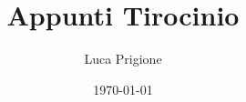 \documentclass[12pt,a4paper,oneside]{report} %
\title{Appunti Tirocinio}
\author{Luca Prigione}
\date{\today}
\begin{document}
\linenumbers %

\maketitle


\end{document}
